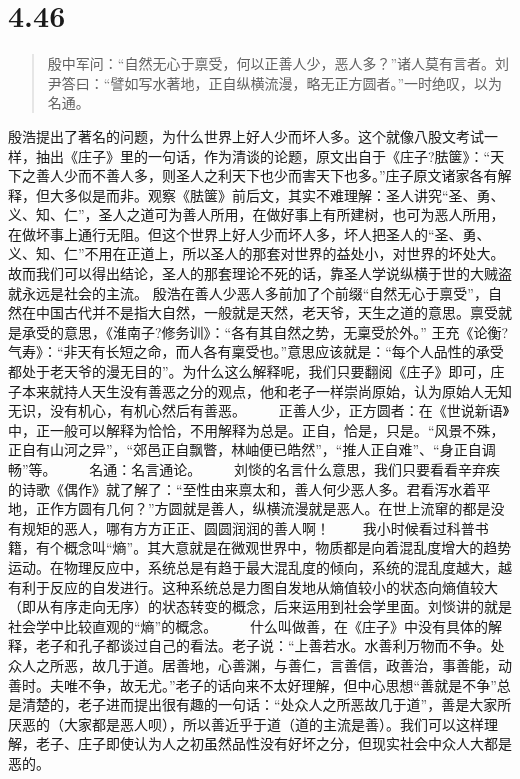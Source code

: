 \documentclass[]{book}
\begin{document}
\section{4.46}\label{section-224}

\begin{quote}
殷中军问：``自然无心于禀受，何以正善人少，恶人多？''诸人莫有言者。刘尹答曰：``譬如写水著地，正自纵横流漫，略无正方圆者。''一时绝叹，以为名通。
\end{quote}

殷浩提出了著名的问题，为什么世界上好人少而坏人多。这个就像八股文考试一样，抽出《庄子》里的一句话，作为清谈的论题，原文出自于《庄子?胠箧》：``天下之善人少而不善人多，则圣人之利天下也少而害天下也多。''庄子原文诸家各有解释，但大多似是而非。观察《胠箧》前后文，其实不难理解：圣人讲究``圣、勇、义、知、仁''，圣人之道可为善人所用，在做好事上有所建树，也可为恶人所用，在做坏事上通行无阻。但这个世界上好人少而坏人多，坏人把圣人的``圣、勇、义、知、仁''不用在正道上，所以圣人的那套对世界的益处小，对世界的坏处大。故而我们可以得出结论，圣人的那套理论不死的话，靠圣人学说纵横于世的大贼盗就永远是社会的主流。
殷浩在善人少恶人多前加了个前缀``自然无心于禀受''，自然在中国古代并不是指大自然，一般就是天然，老天爷，天生之道的意思。禀受就是承受的意思，《淮南子?修务训》：``各有其自然之势，无稟受於外。''
王充《论衡?气寿》：``非天有长短之命，而人各有稟受也。''意思应该就是：``每个人品性的承受都处于老天爷的漫无目的''。为什么这么解释呢，我们只要翻阅《庄子》即可，庄子本来就持人天生没有善恶之分的观点，他和老子一样崇尚原始，认为原始人无知无识，没有机心，有机心然后有善恶。
　　正善人少，正方圆者：在《世说新语》中，正一般可以解释为恰恰，不用解释为总是。正自，恰是，只是。``风景不殊，正自有山河之异''，``郊邑正自飘瞥，林岫便已皓然''，``推人正自难''、``身正自调畅''等。
　　名通：名言通论。
　　刘惔的名言什么意思，我们只要看看辛弃疾的诗歌《偶作》就了解了：``至性由来禀太和，善人何少恶人多。君看泻水着平地，正作方圆有几何？''方圆就是善人，纵横流漫就是恶人。在世上流窜的都是没有规矩的恶人，哪有方方正正、圆圆润润的善人啊！
　　我小时候看过科普书籍，有个概念叫``熵''。其大意就是在微观世界中，物质都是向着混乱度增大的趋势运动。在物理反应中，系统总是有趋于最大混乱度的倾向，系统的混乱度越大，越有利于反应的自发进行。这种系统总是力图自发地从熵值较小的状态向熵值较大（即从有序走向无序）的状态转变的概念，后来运用到社会学里面。刘惔讲的就是社会学中比较直观的``熵''的概念。
　　什么叫做善，在《庄子》中没有具体的解释，老子和孔子都谈过自己的看法。老子说：``上善若水。水善利万物而不争。处众人之所恶，故几于道。居善地，心善渊，与善仁，言善信，政善治，事善能，动善时。夫唯不争，故无尤。''老子的话向来不太好理解，但中心思想``善就是不争''总是清楚的，老子进而提出很有趣的一句话：``处众人之所恶故几于道''，善是大家所厌恶的（大家都是恶人呗），所以善近乎于道（道的主流是善）。我们可以这样理解，老子、庄子即使认为人之初虽然品性没有好坏之分，但现实社会中众人大都是恶的。
\end{document}
